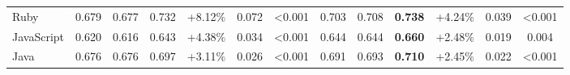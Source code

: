 \begin{table*}[h]
{\begin{tabular}{lcccccccccccc}
Ruby                                                                                & 0.679                                                                           & 0.677                                                                              & 0.732                                                                         & +8.12\%                          & 0.072                                           & \textless{}0.001                                                                  & 0.703                                                                            & 0.708                                                                              & \textbf{0.738 }                                                                         & +4.24\%                          & 0.039                                           & \textless{}0.001                                                                  \\
JavaScript                                                                          & 0.620                                                                           & 0.616                                                                              & 0.643                                                                         & +4.38\%                          &  0.034                                          & \textless{}0.001                                                                  & 0.644                                                                            & 0.644                                                                              & \textbf{0.660}                                                                          & +2.48\%                          &  0.019                                          & 0.004 \\
Java                                                                                & 0.676                                                                           & 0.676                                                                              & 0.697                                                                         & +3.11\%                          & 0.026                                         & \textless{}0.001                                                                  & 0.691                                                                            & 0.693                                                                              & \textbf{0.710 }                                                                         & +2.45\%                          &  0.022                                        & \textless{}0.001                                                                  \\

\end{tabular}}
\end{table*}
